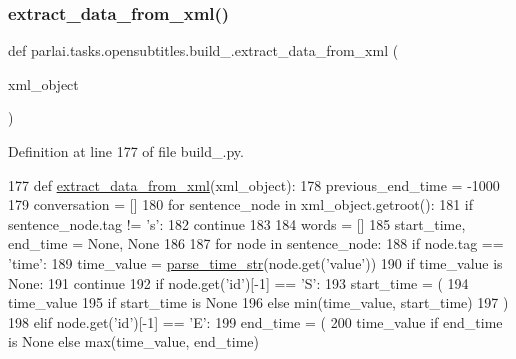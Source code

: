 \subsubsection{\texorpdfstring{extract\+\_\+data\+\_\+from\+\_\+xml()}{extract\_data\_from\_xml()}}
{\footnotesize\ttfamily def parlai.\+tasks.\+opensubtitles.\+build\+\_.\+extract\+\_\+data\+\_\+from\+\_\+xml (\begin{DoxyParamCaption}\item[{}]{xml\+\_\+object }\end{DoxyParamCaption})}



Definition at line 177 of file build\+\_.\+py.


\begin{DoxyCode}
177 \textcolor{keyword}{def }\hyperlink{namespaceparlai_1_1tasks_1_1opensubtitles_1_1build__2018_a7d8f1a916c145086bed432195a8ce504}{extract\_data\_from\_xml}(xml\_object):
178     previous\_end\_time = -1000
179     conversation = []
180     \textcolor{keywordflow}{for} sentence\_node \textcolor{keywordflow}{in} xml\_object.getroot():
181         \textcolor{keywordflow}{if} sentence\_node.tag != \textcolor{stringliteral}{'s'}:
182             \textcolor{keywordflow}{continue}
183 
184         words = []
185         start\_time, end\_time = \textcolor{keywordtype}{None}, \textcolor{keywordtype}{None}
186 
187         \textcolor{keywordflow}{for} node \textcolor{keywordflow}{in} sentence\_node:
188             \textcolor{keywordflow}{if} node.tag == \textcolor{stringliteral}{'time'}:
189                 time\_value = \hyperlink{namespaceparlai_1_1tasks_1_1opensubtitles_1_1build__2018_aadc6244a9ec9fec904b712f932ec8b40}{parse\_time\_str}(node.get(\textcolor{stringliteral}{'value'}))
190                 \textcolor{keywordflow}{if} time\_value \textcolor{keywordflow}{is} \textcolor{keywordtype}{None}:
191                     \textcolor{keywordflow}{continue}
192                 \textcolor{keywordflow}{if} node.get(\textcolor{stringliteral}{'id'})[-1] == \textcolor{stringliteral}{'S'}:
193                     start\_time = (
194                         time\_value
195                         \textcolor{keywordflow}{if} start\_time \textcolor{keywordflow}{is} \textcolor{keywordtype}{None}
196                         \textcolor{keywordflow}{else} min(time\_value, start\_time)
197                     )
198                 \textcolor{keywordflow}{elif} node.get(\textcolor{stringliteral}{'id'})[-1] == \textcolor{stringliteral}{'E'}:
199                     end\_time = (
200                         time\_value \textcolor{keywordflow}{if} end\_time \textcolor{keywordflow}{is} \textcolor{keywordtype}{None} \textcolor{keywordflow}{else} max(time\_value, end\_time)

\end{DoxyCode}
